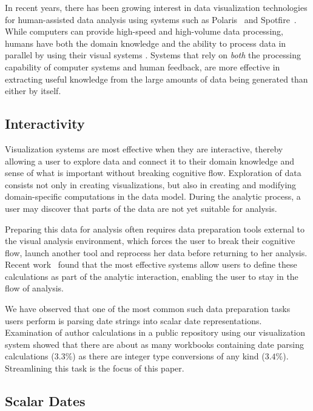 In recent years, there has been growing interest in data visualization technologies for human-assisted data analysis using systems such as Polaris~\cite{Stolte:2008} and Spotfire~\cite{Ahlberg:1996}. While computers can provide high-speed and high-volume data processing, humans have both the domain knowledge and the ability to process data in parallel by using their visual systems \cite{Cleveland.McGill1984,Mackinlay:1986}. 
Systems that rely on \emph{both} the processing capability of computer systems and human feedback, are more effective in extracting useful knowledge from the large amounts of data being generated than either by itself.

\subsection{Interactivity}
Visualization systems are most effective when they are interactive, thereby allowing a user to explore data and connect it to their domain knowledge and sense of what is important without breaking cognitive flow. 
Exploration of data consists not only in creating visualizations, but also in creating and modifying domain-specific computations in the data model. 
During the analytic process, a user may discover that parts of the data are not yet suitable for analysis. 

Preparing this data for analysis often requires data preparation tools external to the visual analysis environment, which forces the user to break their cognitive flow, launch another tool and reprocess her data before returning to her analysis. 
Recent work~\cite{Morton:2012} found that the most effective systems allow users to define these calculations as part of the analytic interaction, enabling the user to stay in the flow of analysis.

We have observed that one of the most common such data preparation tasks users perform is parsing date strings into scalar date representations.
Examination of author calculations in a public repository using our
visualization system showed that there are about as many workbooks containing date parsing calculations ($3.3\%$) as there are
integer type conversions of any kind ($3.4\%$).
Streamlining this task is the focus of this paper.

\subsection{Scalar Dates}

